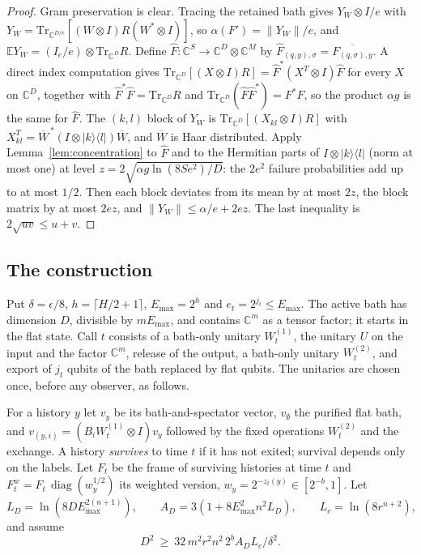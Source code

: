 \documentclass[11pt,a4paper]{article}
\theoremstyle{plain}
\theoremstyle{definition}
\theoremstyle{remark}
\DeclareMathOperator{\diag}{diag}
\begin{document}
\begin{proof}
Gram preservation is clear. Tracing the retained bath gives $Y_W\otimes I/e$ with
$Y_W=\mathrm{Tr}_{\mathbb{C}^{D/e}}[(W\otimes I)R(W^*\otimes I)]$, so $\alpha(F')=\|Y_W\|/e$, and $\mathbb{E}Y_W=(I_e/e)\otimes\mathrm{Tr}_{\mathbb{C}^D}R$.
Define $\hat F:\mathbb{C}^S\to\mathbb{C}^D\otimes\mathbb{C}^M$ by $\hat F_{(q,y),\sigma}=\overline{F_{(q,\sigma),y}}$. A direct index
computation gives $\mathrm{Tr}_{\mathbb{C}^D}[(X\otimes I)R]=\hat F^*(X^{T}\otimes I)\hat F$ for every $X$ on $\mathbb{C}^D$, together with
$\hat F^*\hat F=\mathrm{Tr}_{\mathbb{C}^D}R$ and $\mathrm{Tr}_{\mathbb{C}^D}(\hat F\hat F^*)=F^*F$, so the product $\alpha g$ is the same
for $\hat F$. The $(k,l)$ block of $Y_W$ is $\mathrm{Tr}_{\mathbb{C}^D}[(X_{kl}\otimes I)R]$ with
$X_{kl}^T=\overline{W}^{\,*}(I\otimes|k\rangle\langle l|)\overline{W}$, and $\overline W$ is Haar distributed. Apply
Lemma~\ref{lem:concentration} to $\hat F$ and to the Hermitian parts of $I\otimes|k\rangle\langle l|$ (norm at most one) at
level $z=2\sqrt{\alpha g\ln(8Se^2)/D}$: the $2e^2$ failure probabilities add up to at most $1/2$. Then each block deviates
from its mean by at most $2z$, the block matrix by at most $2ez$, and $\|Y_W\|\le\alpha/e+2ez$. The last inequality is
$2\sqrt{uv}\le u+v$.
\end{proof}

\subsection{The construction}

Put $\delta=\epsilon/8$, $h=\lceil H/2+1\rceil$, $E_{\max}=2^h$ and $e_t=2^{j_t}\le E_{\max}$. The active bath has dimension $D$,
divisible by $mE_{\max}$, and contains $\mathbb{C}^m$ as a tensor factor; it starts in the flat state. Call $t$ consists of a
bath-only unitary $W_t^{(1)}$, the unitary $U$ on the input and the factor $\mathbb{C}^m$, release of the output, a bath-only
unitary $W_t^{(2)}$, and export of $j_t$ qubits of the bath replaced by flat qubits. The unitaries are chosen once, before
any observer, as follows.

For a history $y$ let $v_y$ be its bath-and-spectator vector, $v_\emptyset$ the purified flat bath, and
$v_{(y,i)}=(B_iW^{(1)}_t\otimes I)v_y$ followed by the fixed operations $W^{(2)}_t$ and the exchange. A history
\emph{survives} to time $t$ if it has not exited; survival depends only on the labels. Let $F_t$ be the frame of surviving
histories at time $t$ and $F^w_t=F_t\,\diag(w_y^{1/2})$ its weighted version, $w_y=2^{-z_t(y)}\in[2^{-b},1]$. Let
\[
L_D=\ln(8DE_{\max}^{2(n+1)}),\qquad A_D=3(1+8E_{\max}^2n^2L_D),\qquad L_c=\ln(8r^{n+2}),
\]
and assume
\begin{equation}\label{eq:Dcondition}
D^2\ \ge\ 32\,m^2r^2n^2\,2^b A_D L_c/\delta^2 .
\end{equation}
\end{document}

